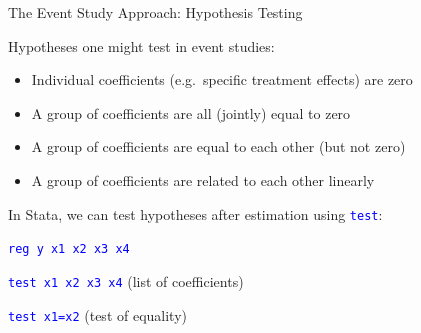 \documentclass[10pt,xcolor=table,ignorenonframetext,handout,aspectratio=169]{beamer}
\newlength{\wideitemsep}
\let\olditem\item
\renewcommand{\item}{\setlength{\itemsep}{\wideitemsep}\olditem}
\begin{document}
\begin{frame}{The Event Study Approach:  Hypothesis Testing}

Hypotheses one might test in event studies:

\medskip
\begin{itemize}
	
	\item Individual coefficients (e.g.~specific treatment effects) are zero
	
	\item A group of coefficients are all (jointly) equal to zero
	
	\item A group of coefficients are equal to each other (but not zero)
	
	\item A group of coefficients are related to each other linearly
	
\end{itemize}

\medskip
\medskip
In Stata, we can test hypotheses after estimation using \textcolor{blue}{\texttt{test}}:

\medskip
\textcolor{blue}{\texttt{reg y x1 x2 x3 x4}}

\textcolor{blue}{\texttt{test x1 x2 x3 x4}} (list of coefficients)

\textcolor{blue}{\texttt{test x1=x2}} (test of equality)

\end{frame}


\end{document}
